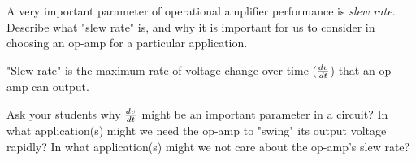 

A very important parameter of operational amplifier performance is {\it slew rate}.  Describe what "slew rate" is, and why it is important for us to consider in choosing an op-amp for a particular application.







"Slew rate" is the maximum rate of voltage change over time ($dv \over dt$) that an op-amp can output.







Ask your students why $dv \over dt$ might be an important parameter in a circuit?  In what application(s) might we need the op-amp to "swing" its output voltage rapidly?  In what application(s) might we not care about the op-amp's slew rate?




